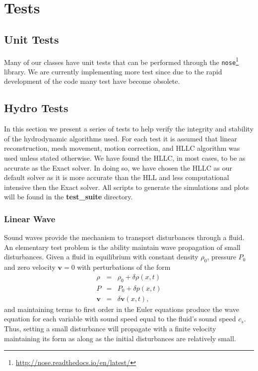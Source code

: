 \section{Tests}
\subsection{Unit Tests}
Many of our classes have unit tests that can be performed through the 
\texttt{nose}\footnote{\url{http://nose.readthedocs.io/en/latest/}} library. We are currently
implementing more test since due to the rapid development of the code many test have
become obsolete.

\subsection{Hydro Tests}
In this section we present a series of tests to help verify the integrity and stability
of the hydrodynamic algorithms used. For each test it is assumed that linear reconstruction,
mesh movement, motion correction, and HLLC algorithm was used unless stated otherwise. We
have found the HLLC, in most cases, to be as accurate as the Exact solver. In doing so, we have 
chosen the HLLC as our default solver as it is more accurate than the HLL and less computational 
intensive then the Exact solver. All scripts to generate the simulations and plots will be found
in the \textbf{test\_suite} directory.

\subsubsection{Linear Wave}
Sound waves provide the mechanism to transport disturbances through a fluid. An
elementary test problem is the ability maintain wave propagation of small
disturbances. Given a fluid in equilibrium with constant density $\rho_0$,
pressure $P_0$ and zero velocity $\mathbf{v}=0$ with perturbations of the form
\begin{equation}
	\begin{array}{rcl}
		\rho & = & \rho_0 + \delta\rho(x,t) \\
   		 P & = & P_0 + \delta p(x,t) \\
    	\mathbf{v} & = & \delta\mathbf{v}(x,t),
    \end{array}
\end{equation}
and maintaining terms to first order in the Euler equations produce the wave
equation for each variable with sound speed equal to the fluid's sound speed 
$c_s$. Thus, setting a small disturbance 
will propagate with a finite velocity maintaining its form as along as the initial
disturbances are relatively small.


